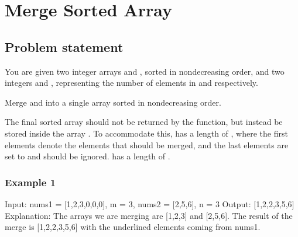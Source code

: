 \documentclass[letterpaper,12pt,english]{book}
\begin{document}
\sphinxstepscope


\section{Merge Sorted Array}
\label{\detokenize{Sorting/04_SORT_88_Merge_Sorted_Array:merge-sorted-array}}\label{\detokenize{Sorting/04_SORT_88_Merge_Sorted_Array::doc}}

\subsection{Problem statement\sphinxfootnotemark[90]}
\label{\detokenize{Sorting/04_SORT_88_Merge_Sorted_Array:problem-statement}}%
\begin{footnotetext}[90]\sphinxAtStartFootnote
{}
%
\end{footnotetext}\ignorespaces 
\sphinxAtStartPar
You are given two integer arrays  and , sorted in non\sphinxhyphen{}decreasing order, and two integers  and , representing the number of elements in  and  respectively.

\sphinxAtStartPar
Merge  and  into a single array sorted in non\sphinxhyphen{}decreasing order.

\sphinxAtStartPar
The final sorted array should not be returned by the function, but instead be stored inside the array . To accommodate this,  has a length of , where the first  elements denote the elements that should be merged, and the last  elements are set to  and should be ignored.  has a length of .


\subsubsection{Example 1}
\label{\detokenize{Sorting/04_SORT_88_Merge_Sorted_Array:example-1}}
\begin{sphinxVerbatim}[commandchars=\\\{\}]
Input: nums1 = [1,2,3,0,0,0], m = 3, nums2 = [2,5,6], n = 3
Output: [1,2,2,3,5,6]
Explanation: The arrays we are merging are [1,2,3] and [2,5,6].
The result of the merge is [1,2,2,3,5,6] with the underlined elements coming from nums1.
\end{sphinxVerbatim}
\end{document}
